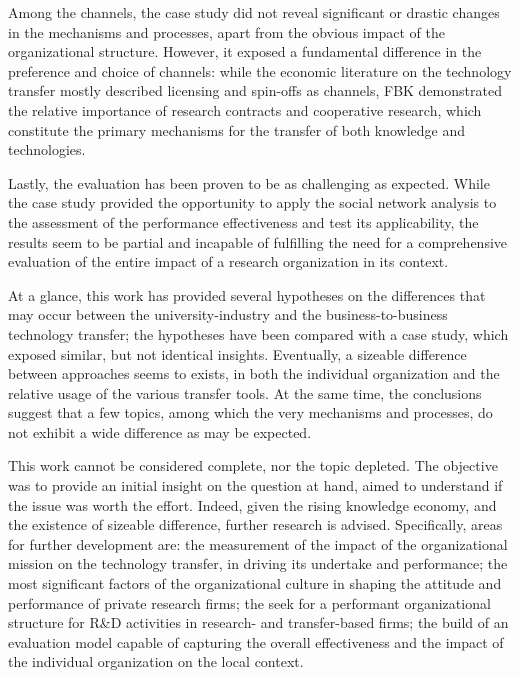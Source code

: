 Among the channels, the case study did not reveal significant or drastic changes in the mechanisms and processes, apart from the obvious impact of the organizational structure. However, it exposed a fundamental difference in the preference and choice of channels: while the economic literature on the technology transfer mostly described licensing and spin-offs as channels, FBK demonstrated the relative importance of research contracts and cooperative research, which constitute the primary mechanisms for the transfer of both knowledge and technologies.

Lastly, the evaluation has been proven to be as challenging as expected. While the case study provided the opportunity to apply the social network analysis to the assessment of the performance effectiveness and test its applicability, the results seem to be partial and incapable of fulfilling the need for a comprehensive evaluation of the entire impact of a research organization in its context. 

At a glance, this work has provided several hypotheses on the differences that may occur between the university-industry and the business-to-business technology transfer; the hypotheses have been compared with a case study, which exposed similar, but not identical insights. Eventually, a sizeable difference between approaches seems to exists, in both the individual organization and the relative usage of the various transfer tools. At the same time, the conclusions suggest that a few topics, among which the very mechanisms and processes, do not exhibit a wide difference as may be expected. 

This work cannot be considered complete, nor the topic depleted. The objective was to provide an initial insight on the question at hand, aimed to understand if the issue was worth the effort. Indeed, given the rising knowledge economy, and the existence of sizeable difference, further research is advised. Specifically, areas for further development are: the measurement of the impact of the organizational mission on the technology transfer, in driving its undertake and performance; the most significant factors of the organizational culture in shaping the attitude and performance of private research firms; the seek for a performant organizational structure for R\&D activities in research- and transfer-based firms; the build of an evaluation model capable of capturing the overall effectiveness and the impact of the individual organization on the local context. 